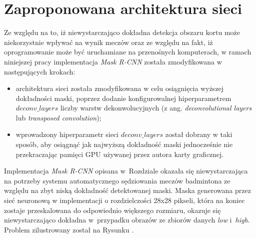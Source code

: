 \newpage
\section{Zaproponowana architektura sieci}
\label{sec:zaproponowana_architektura}

Ze względu na to, iż niewystarczająco dokładna detekcja obszaru kortu może niekorzystnie wpływać na wynik meczów oraz ze względu na fakt, iż oprogramowanie może być uruchamiane na przenośnych komputerach, w ramach niniejszej pracy implementacja \textit{Mask R-CNN} została zmodyfikowana w następujących krokach:

\begin{itemize}
	\item architektura sieci została zmodyfikowana w celu osiągnięcia wyższej dokładności maski, poprzez dodanie konfigurowalnej hiperparametrem $deconv\_layers$ liczby warstw dekonwolucyjnych (z ang. \textit{deconvolutional layers} lub \textit{transposed convolution});
	\item wprowadzony hiperparametr sieci $deconv\_layers$ został dobrany w taki sposób, aby osiągnąć jak najwyższą dokładność maski jednocześnie nie przekraczając pamięci GPU używanej przez autora karty graficznej.
\end{itemize}

Implementacja \textit{Mask R-CNN} opisana w~Rozdziale  okazała się niewystarczająca na potrzeby systemu automatycznego sędziowania meczów badmintona ze względu na zbyt niską dokładność detektowanej maski.
Maska generowana przez sieć neuronową w implementacji \cite{matterport-mask-rcnn} o rozdzielczości 28x28 pikseli, która na koniec zostaje przeskalowana do odpowiednio większego rozmiaru, okazuje się niewystarczająco dokładna w~przypadku obrazów ze zbiorów danych \textit{low} i~\textit{high}.
Problem zilustrowany został na Rysunku . 


